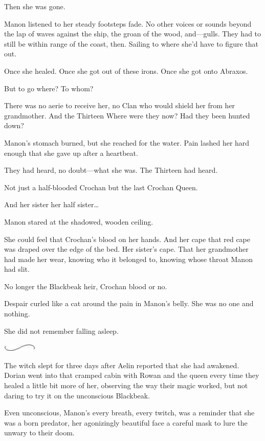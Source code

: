 Then she was gone.

Manon listened to her steady footsteps fade. No other voices or sounds beyond the lap of waves against the ship, the groan of the wood, and---gulls. They had to still be within range of the coast, then. Sailing to where  she'd have to figure that out.

Once she healed. Once she got out of these irons. Once she got onto Abraxos.

But to go where? To whom?

There was no aerie to receive her, no Clan who would shield her from her grandmother. And the Thirteen  Where were they now? Had they been hunted down?

Manon's stomach burned, but she reached for the water. Pain lashed her hard enough that she gave up after a heartbeat.

They had heard, no doubt---what she was. The Thirteen had heard.

Not just a half-blooded Crochan  but the last Crochan Queen.

And her sister  her half sister\ldots{}

Manon stared at the shadowed, wooden ceiling.

She could feel that Crochan's blood on her hands. And her cape 
that red cape was draped over the edge of the bed. Her sister's cape. That her grandmother had made her wear, knowing who it belonged to, knowing whose throat Manon had slit.

No longer the Blackbeak heir, Crochan blood or no.

Despair curled like a cat around the pain in Manon's belly. She was no one and nothing.

She did not remember falling asleep.

\includegraphics[width=0.65in,height=0.13in]{images/seperator}

The witch slept for three days after Aelin reported that she had awakened. Dorian went into that cramped cabin with Rowan and the queen every time they healed a little bit more of her, observing the way their magic worked, but not daring to try it on the unconscious Blackbeak.

Even unconscious, Manon's every breath, every twitch, was a reminder that she was a born predator, her agonizingly beautiful face a careful mask to lure the unwary to their doom.


